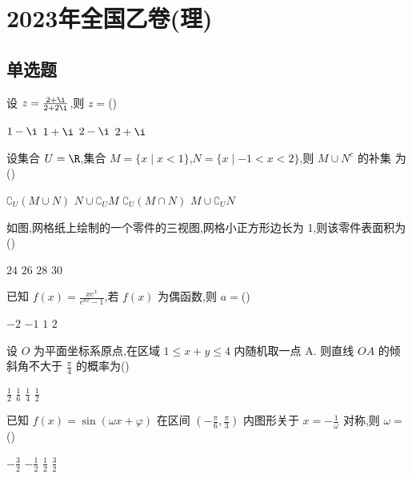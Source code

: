 \chapter{2023年全国乙卷(理)}

\section{单选题}

\begin{problem}
设 \(z=\frac{2+\i}{2+2\i}\),则 \(z=\)(\quad)

\choices
    {\(1-\i\)}
    {\(1+\i\)}
    {\(2-\i\)}
    {\(2+\i\)}
\end{problem}

\begin{problem}
设集合 \(U=\R\),集合 \(M=\{x\mid x<1\}\),\(N=\{x\mid -1<x<2\}\),则 \(M\cup N^c\text{ 的补集}\) 为(\quad)

\choices
    {\(\complement_U(M\cup N)\)}
    {\(N\cup\complement_U M\)}
    {\(\complement_U(M\cap N)\)}
    {\(M\cup\complement_U N\)}
\end{problem}

\begin{problem}
如图,网格纸上绘制的一个零件的三视图,网格小正方形边长为 1,则该零件表面积为(\quad)

\begin{center}
\end{center}

\choices
    {\(24\)}
    {\(26\)}
    {\(28\)}
    {\(30\)}
\end{problem}

\begin{problem}
已知 \(f(x)=\frac{x e^x}{e^{ax}-1}\),若 \(f(x)\) 为偶函数,则 \(a=\)(\quad)

\choices
    {\(-2\)}
    {\(-1\)}
    {\(1\)}
    {\(2\)}
\end{problem}

\begin{problem}
设 \(O\) 为平面坐标系原点,在区域 \(1\le x+y\le4\) 内随机取一点 A. 则直线 \(OA\) 的倾斜角不大于 \(\frac\pi4\) 的概率为(\quad)

\choices
    {\(\frac12\)}
    {\(\frac16\)}
    {\(\frac14\)}
    {\(\frac12\)}
\end{problem}

\begin{problem}
已知 \(f(x)=\sin(\omega x+\varphi)\) 在区间 \(\left(-\frac\pi6,\frac\pi3\right)\) 内图形关于 \(x=-\frac1\omega\) 对称,则 \(\omega=\)(\quad)

\choices
    {\(-\frac32\)}
    {\(-\frac12\)}
    {\(\frac12\)}
    {\(\frac32\)}
\end{problem}

